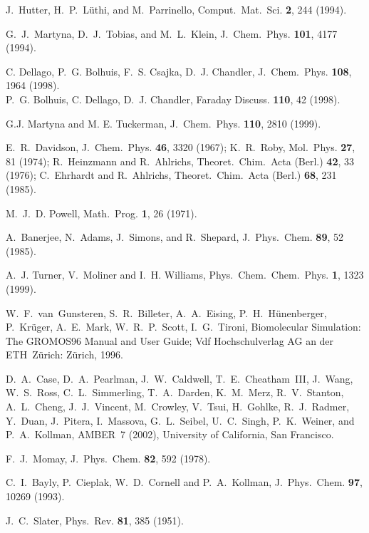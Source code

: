 \documentclass[twoside,10pt,titlepage,a4paper]{article}
\begin{document}
\begin{thebibliography}{999}
    J.~Hutter, H.~P.~L\"uthi, and M.~Parrinello,
    Comput.~Mat.~Sci. {\bf 2}, 244 (1994).

    G.~J.~Martyna, D.~J.~Tobias, and M.~L.~Klein,
    J.~Chem.~Phys. {\bf 101}, 4177 (1994).

     C. Dellago, P.~G. Bolhuis, F.~S. Csajka, D.~J. Chandler, J.~Chem.~Phys. {\bf 108}, 1964 (1998). \\
     P.~G. Bolhuis, C. Dellago, D.~J. Chandler, Faraday Discuss. {\bf 110}, 42 (1998).

 G.J. Martyna and M. E. Tuckerman,
    J.~Chem.~Phys. {\bf 110}, 2810 (1999).

    E.~R.~Davidson, J.~Chem.~Phys. {\bf 46}, 3320 (1967);
    K.~R.~Roby, Mol.~Phys. {\bf 27}, 81 (1974);
    R.~Heinzmann and R.~Ahlrichs, Theoret.~Chim.~Acta (Berl.)
    {\bf 42}, 33 (1976);
    C.~Ehrhardt and R.~Ahlrichs, Theoret.~Chim.~Acta (Berl.)
    {\bf 68}, 231 (1985).

    M.~J.~D. Powell, Math.~Prog. {\bf 1}, 26 (1971).

    A.~Banerjee, N.~Adams, J.~Simons, and R.~Shepard,
    J.~Phys.~Chem. {\bf 89}, 52 (1985).

    A.~J. Turner, V.~Moliner and I.~H. Williams,
    Phys.~Chem.~Chem.~Phys. {\bf 1}, 1323 (1999).

    W.~F.~van~Gunsteren, S.~R.~Billeter, A.~A.~Eising, P.~H.~H\"unenberger,
    P.~Kr\"uger, A.~E.~Mark, W.~R.~P.~Scott, I.~G.~Tironi,
    Biomolecular Simulation: The GROMOS96 Manual and User Guide;
    Vdf Hochschulverlag AG an der ETH~Z\"urich: Z\"urich, 1996.

    D.~A.~Case, D.~A.~Pearlman, J.~W.~Caldwell, T.~E.~Cheatham~III, J.~Wang,
    W.~S.~Ross, C.~L.~Simmerling, T.~A.~Darden, K.~M.~Merz, R.~V.~Stanton,
    A.~L.~Cheng, J.~J.~Vincent, M.~Crowley, V.~Tsui, H.~Gohlke, R.~J.~Radmer,
    Y.~Duan, J.~Pitera, I.~Massova, G.~L.~Seibel, U.~C.~Singh, P.~K.~Weiner,
    and P.~A.~Kollman, AMBER~7 (2002), University of California, San Francisco.

    F.~J.~Momay,
    J.~Phys.~Chem. {\bf 82}, 592 (1978).

    C.~I.~Bayly, P.~Cieplak, W.~D.~Cornell and P.~A.~Kollman,
    J.~Phys.~Chem. {\bf 97}, 10269 (1993).

    J.~C.~Slater, Phys.~Rev. {\bf 81}, 385 (1951).


\end{thebibliography}
\end{document}
